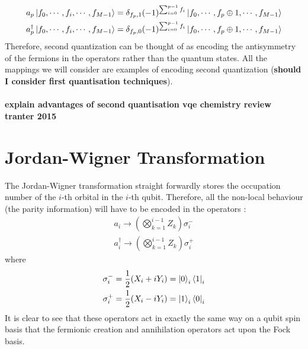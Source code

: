 \documentclass[twoside]{article}
\begin{document}
\begin{equation}
        \label{secondQuant}
        \begin{align}
        a_p \ket{f_0,\cdots, f_i, \cdots, f_{M-1}} = \delta_{f_p, 1} (-1)^{\sum_{i=0}^{p-1} f_i} \ket{f_0,\cdots, f_p \oplus 1, \cdots, f_{M-1}}\\
        a_p^{\dagger} \ket{f_0,\cdots, f_i, \cdots, f_{M-1}} = \delta_{f_p, 0} (-1)^{\sum_{i=0}^{p-1} f_i} \ket{f_0,\cdots, f_p \oplus 1, \cdots, f_{M-1}}
\end{align}
\end{equation}
Therefore, second quantization can be thought of as encoding the antisymmetry of the fermions in the operators rather than the quantum states. All the mappings we will consider are examples of encoding second quantization (\textbf{should I consider first quantisation techniques}).\\\\
\textbf{explain advantages of second quantisation vqe chemistry review tranter 2015}
\section{Jordan-Wigner Transformation}\label{jordan-wigner_section}
The Jordan-Wigner transformation straight forwardly stores the occupation number of the $i$-th orbital in the $i$-th qubit. Therefore, all the non-local behaviour (the parity information) will have to be encoded in the operators \cite{fermionicEncoding}:
\begin{equation}
        \begin{align}
        a_i \rightarrow \left( \bigotimes_{k=1}^{i-1} Z_k \right) \sigma_i^-\\
        a^{\dagger}_i \rightarrow \left( \bigotimes_{k=1}^{i-1} Z_k \right) \sigma_i^+
\end{align}
\end{equation}
where
\begin{equation}
        \begin{align}
                \sigma^-_i = \frac{1}{2} (X_i + i Y_i) = \ket{0}_i \bra{1}_i\\
                \sigma^+_i = \frac{1}{2} (X_i - i Y_i) = \ket{1}_i \bra{0}_i 
        \end{align}
\end{equation}
It is clear to see that these operators act in exactly the same way on a qubit spin basis that the fermionic creation and annihilation operators act upon the Fock basis.
\end{document}

